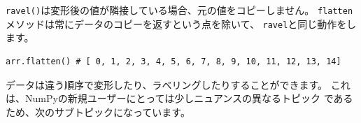 \documentclass{jsarticle}
\begin{document}
            \verb|ravel()|は変形後の値が隣接している場合、元の値をコピーしません。
            \verb|flatten|メソッドは常にデータのコピーを返すという点を除いて、
            \verb|ravel|と同じ動作をします。

            \begin{lstlisting}
arr.flatten() # [ 0, 1, 2, 3, 4, 5, 6, 7, 8, 9, 10, 11, 12, 13, 14]\end{lstlisting}

            データは違う順序で変形したり、ラベリングしたりすることができます。
            これは、NumPyの新規ユーザーにとっては少しニュアンスの異なるトピック
            であるため、次のサブトピックになっています。
\end{document}
